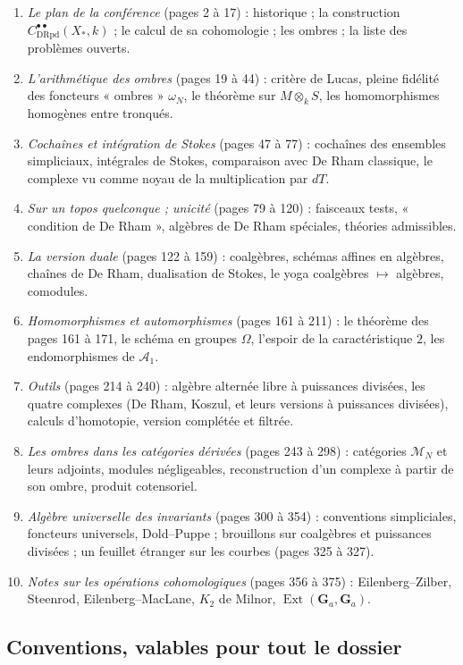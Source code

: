 \documentclass[11pt,a4paper]{article}
\begin{document}
\begin{enumerate}
\item \emph{Le plan de la conférence} (pages 2 à 17) : historique ; la
construction $C^{\bullet\bullet}_{\mathrm{DRpd}}(X_*,k)$ ; le calcul de sa
cohomologie ; les ombres ; la liste des problèmes ouverts.
\item \emph{L'arithmétique des ombres} (pages 19 à 44) : critère de Lucas,
pleine fidélité des foncteurs « ombres » $\omega_N$, le théorème sur
$M \otimes_k S$, les homomorphismes homogènes entre tronqués.
\item \emph{Cochaînes et intégration de Stokes} (pages 47 à 77) : cochaînes des
ensembles simpliciaux, intégrales de Stokes, comparaison avec De Rham
classique, le complexe vu comme noyau de la multiplication par $dT$.
\item \emph{Sur un topos quelconque ; unicité} (pages 79 à 120) : faisceaux
tests, « condition de De Rham », algèbres de De Rham spéciales, théories
admissibles.
\item \emph{La version duale} (pages 122 à 159) : coalgèbres, schémas affines
en algèbres, chaînes de De Rham, dualisation de Stokes, le yoga coalgèbres
$\mapsto$ algèbres, comodules.
\item \emph{Homomorphismes et automorphismes} (pages 161 à 211) : le théorème
des pages 161 à 171, le schéma en groupes $\Omega$, l'espoir de la
caractéristique $2$, les endomorphismes de $\mathcal{A}_1$.
\item \emph{Outils} (pages 214 à 240) : algèbre alternée libre à puissances
divisées, les quatre complexes (De Rham, Koszul, et leurs versions à
puissances divisées), calculs d'homotopie, version complétée et filtrée.
\item \emph{Les ombres dans les catégories dérivées} (pages 243 à 298) :
catégories $\mathcal{M}_N$ et leurs adjoints, modules négligeables,
reconstruction d'un complexe à partir de son ombre, produit cotensoriel.
\item \emph{Algèbre universelle des invariants} (pages 300 à 354) :
conventions simpliciales, foncteurs universels, Dold–Puppe ; brouillons sur
coalgèbres et puissances divisées ; un feuillet étranger sur les courbes
(pages 325 à 327).
\item \emph{Notes sur les opérations cohomologiques} (pages 356 à 375) :
Eilenberg–Zilber, Steenrod, Eilenberg–MacLane, $K_2$ de Milnor,
$\operatorname{Ext}(\mathbf{G}_a, \mathbf{G}_a)$.
\end{enumerate}

\subsection*{Conventions, valables pour tout le dossier}
\end{document}
